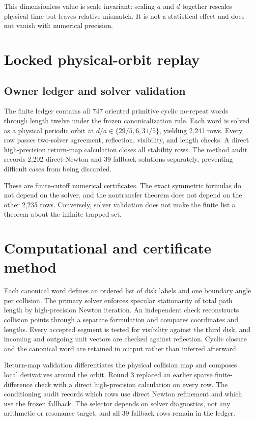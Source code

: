 \documentclass[11pt,a4paper]{article}
\theoremstyle{definition}
\theoremstyle{remark}
\begin{document}
This dimensionless value is scale invariant: scaling \(a\) and \(d\) together rescales physical time but leaves relative mismatch. It is not a statistical effect and does not vanish with numerical precision.

\section{Locked physical-orbit replay}

\subsection{Owner ledger and solver validation}

The finite ledger contains all 747 oriented primitive cyclic no-repeat words through length twelve under the frozen canonicalization rule. Each word is solved as a physical periodic orbit at \(d/a\in\{29/5,6,31/5\}\), yielding 2,241 rows. Every row passes two-solver agreement, reflection, visibility, and length checks. A direct high-precision return-map calculation closes all stability rows. The method audit records 2,202 direct-Newton and 39 fallback solutions separately, preventing difficult cases from being discarded.

These are finite-cutoff numerical certificates. The exact symmetric formulas do not depend on the solver, and the nontransfer theorem does not depend on the other 2,235 rows. Conversely, solver validation does not make the finite list a theorem about the infinite trapped set.

\section{Computational and certificate method}

Each canonical word defines an ordered list of disk labels and one boundary angle per collision. The primary solver enforces specular stationarity of total path length by high-precision Newton iteration. An independent check reconstructs collision points through a separate formulation and compares coordinates and lengths. Every accepted segment is tested for visibility against the third disk, and incoming and outgoing unit vectors are checked against reflection. Cyclic closure and the canonical word are retained in output rather than inferred afterward.

Return-map validation differentiates the physical collision map and composes local derivatives around the orbit. Round 3 replaced an earlier sparse finite-difference check with a direct high-precision calculation on every row. The conditioning audit records which rows use direct Newton refinement and which use the frozen fallback. The selector depends on solver diagnostics, not any arithmetic or resonance target, and all 39 fallback rows remain in the ledger.
\end{document}
